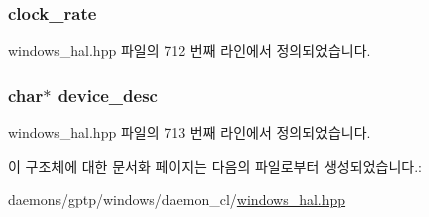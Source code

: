 \subsubsection[{\texorpdfstring{clock\+\_\+rate}{clock_rate}}]{ clock\+\_\+rate}\hypertarget{struct_device_clock_rate_mapping_a4ff69d868409c6c16c86cab87ee0a3bf}{}\label{struct_device_clock_rate_mapping_a4ff69d868409c6c16c86cab87ee0a3bf}


windows\+\_\+hal.\+hpp 파일의 712 번째 라인에서 정의되었습니다.

\subsubsection[{\texorpdfstring{device\+\_\+desc}{device_desc}}]{\setlength{\rightskip}{0pt plus 5cm}char$\ast$ device\+\_\+desc}\hypertarget{struct_device_clock_rate_mapping_af296ea48c692225a5d06a2675a82b0df}{}\label{struct_device_clock_rate_mapping_af296ea48c692225a5d06a2675a82b0df}


windows\+\_\+hal.\+hpp 파일의 713 번째 라인에서 정의되었습니다.



이 구조체에 대한 문서화 페이지는 다음의 파일로부터 생성되었습니다.\+:\begin{DoxyCompactItemize}
\item 
daemons/gptp/windows/daemon\+\_\+cl/\hyperlink{windows__hal_8hpp}{windows\+\_\+hal.\+hpp}\end{DoxyCompactItemize}

